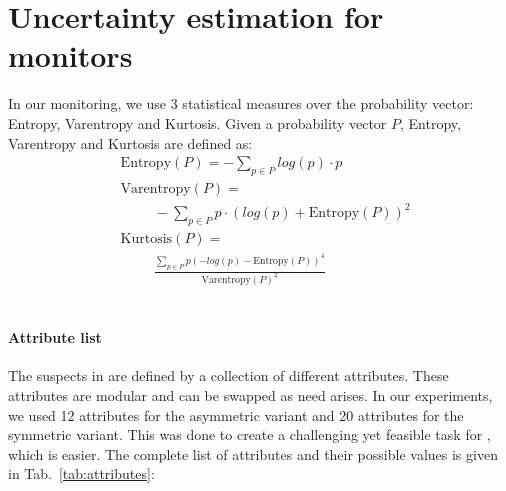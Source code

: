 
\section{Uncertainty estimation for monitors}
\label{sec:stat_measures}
In our monitoring, we use 3 statistical measures over the probability vector: Entropy, Varentropy and Kurtosis.
Given a probability vector $P$, Entropy, Varentropy and Kurtosis are defined as:
\begin{align*}
&\text{Entropy}(P) = -\sum_{p\in P} log(p)\cdot p \\
&\text{Varentropy}(P) = \\ 
&\hspace{1cm} -\sum_{p\in P} p \cdot (log(p) + \text{Entropy}(P))^2 \\
& \text{Kurtosis}(P) = \\
&\hspace{1cm} \frac{\sum_{p\in P} p (-log(p) - \text{Entropy}(P))^4}{\text{Varentropy}(P)^2}
\end{align*}


\section{\ourenv{}}
\label{app:attributes}
\paragraph{Attribute list} The suspects in \ourenv{} are defined by a collection of different attributes. These attributes are modular and can be swapped as need arises. In our experiments, we used 12 attributes for the asymmetric variant and 20 attributes for the symmetric variant. This was done to create a challenging yet feasible task for \ourenvsym{}, which is easier. The complete list of attributes and their possible values is given in Tab.~\ref{tab:attributes}: 




